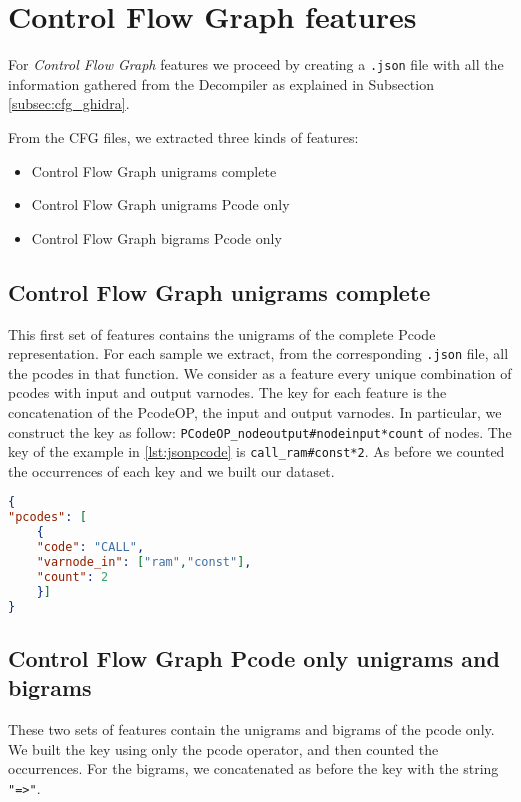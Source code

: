 \section{Control Flow Graph features}
For \textit{Control Flow Graph} features we proceed by creating a \texttt{.json} file with all the information gathered from the Decompiler as explained in Subsection \ref{subsec:cfg_ghidra}.

From the CFG files, we extracted three kinds of features:
\begin{itemize}
	\item {Control Flow Graph unigrams complete}
	\item {Control Flow Graph unigrams Pcode only}
	\item {Control Flow Graph bigrams Pcode only}
\end{itemize}

\subsection{Control Flow Graph unigrams complete}
This first set of features contains the unigrams of the complete Pcode representation.
For each sample we extract, from the corresponding \texttt{.json} file, all the pcodes in that function. We consider as a feature every unique combination of pcodes with input and output varnodes.
The key for each feature is the concatenation of the PcodeOP, the input and output varnodes. In particular, we construct the key as follow:
\texttt{PCodeOP\_nodeoutput\#nodeinput*count} of nodes.
The key of the example in \ref{lst:jsonpcode} is \texttt{call\_ram\#const*2}. As before we counted the occurrences of each key and we built our dataset.

\begin{lstlisting}[language=json,firstnumber=1,caption={Example of .json format with PCode},label={lst:jsonpcode}]
{
"pcodes": [
	{
	"code": "CALL",
	"varnode_in": ["ram","const"],
	"count": 2 
	}]
}
\end{lstlisting}



\subsection{Control Flow Graph Pcode only unigrams and bigrams}

These two sets of features contain the unigrams and bigrams of the pcode only. We built the key using only the pcode operator, and then counted the occurrences. For the bigrams, we concatenated as before the key with the string \texttt{"=>"}.

